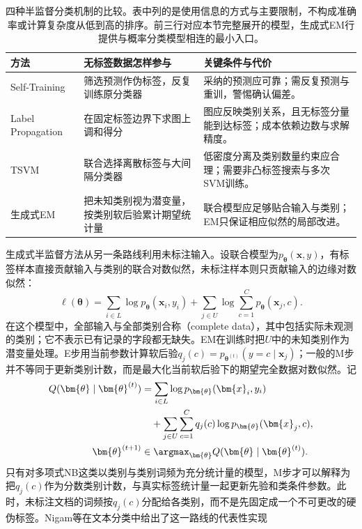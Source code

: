 \begin{table}[htbp]
  \centering
  \small
  \begin{tabularx}{\linewidth}{@{}>{\RaggedRight\arraybackslash}p{25mm}>{\RaggedRight\arraybackslash}X>{\RaggedRight\arraybackslash}X@{}}
    \toprule
    方法 & 无标签数据怎样参与 & 关键条件与代价 \\
    \midrule
    Self-Training & 筛选预测作伪标签，反复训练原分类器 & 采纳的预测应可靠；需反复预测与重训，警惕确认偏差。 \\
    Label Propagation & 在固定标签边界下求图上调和得分 & 图应反映类别关系，且无标签分量能到达标签；成本依赖边数与求解精度。 \\
    TSVM & 联合选择离散标签与大间隔分类器 & 低密度分离及类别数量约束应合理；需要非凸标签搜索与多次SVM训练。 \\
    生成式EM & 把未知类别视为潜变量，按类别软后验累计期望统计量 & 联合模型应足够贴合输入与类别；EM只保证相应似然的局部改进。 \\
    \bottomrule
  \end{tabularx}
  \caption{四种半监督分类机制的比较。表中列的是使用信息的方式与主要限制，不构成准确率或计算复杂度从低到高的排序。前三行对应本节完整展开的模型，生成式EM行提供与概率分类模型相连的最小入口。}
  \label{tab:classification-semisupervised-comparison}
\end{table}

生成式半监督方法从另一条路线利用未标注输入。设联合模型为$p_{\bm{\theta}}(\bm{x},y)$，有标签样本直接贡献输入与类别的联合对数似然，未标注样本则只贡献输入的边缘对数似然：
\[
  \ell(\bm{\theta})
  =\sum_{i\in L}\log p_{\bm{\theta}}(\bm{x}_i,y_i)
   +\sum_{j\in U}\log\sum_{c=1}^{C}
      p_{\bm{\theta}}(\bm{x}_j,c).
\]
在这个模型中，全部输入与全部类别合称（complete data），其中包括实际未观测的类别；它不表示已有记录的字段都无缺失。EM在训练时把$U$中的未知类别作为潜变量处理。E步用当前参数计算软后验$q_j(c)=p_{\bm{\theta}^{(t)}}(y=c\mid\bm{x}_j)$；一般的M步并不等同于更新类别计数，而是最大化当前软后验下的期望完全数据对数似然。记
\[
  \begin{aligned}
    Q(\bm{\theta}\mid\bm{\theta}^{(t)})
    &=
    \sum_{i\in L}\log p_{\bm{\theta}}(\bm{x}_i,y_i) \\
    &\quad+
    \sum_{j\in U}\sum_{c=1}^{C}
      q_j(c)\log p_{\bm{\theta}}(\bm{x}_j,c), \\
    \bm{\theta}^{(t+1)}
    &\in\argmax_{\bm{\theta}}
      Q(\bm{\theta}\mid\bm{\theta}^{(t)}).
  \end{aligned}
\]
只有对多项式NB这类以类别与类别词频为充分统计量的模型，M步才可以解释为把$q_j(c)$作为分数类别计数，与真实标签统计量一起更新先验和类条件参数。此时，未标注文档的词频按$q_j(c)$分配给各类别，而不是先固定成一个不可更改的硬伪标签。Nigam等在文本分类中给出了这一路线的代表性实现

